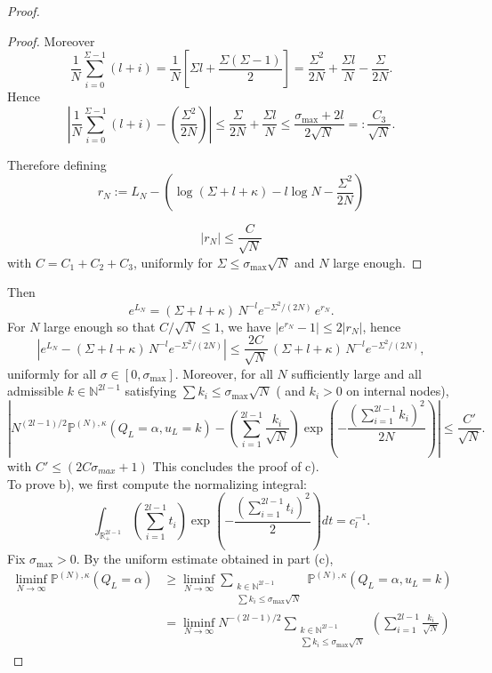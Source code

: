 \documentclass[10pt,a4paper]{amsart}
\begin{document}
\begin{proof}
\begin{proof}
\noindent
Moreover
\[
\frac1N\sum_{i=0}^{\Sigma-1}(l+i)
=
\frac1N\left[\Sigma l+\frac{\Sigma(\Sigma-1)}2\right]=
\frac{\Sigma^2}{2N}
+\frac{\Sigma l}{N}
-\frac{\Sigma}{2N}.
\]
\medskip
\noindent
Hence
\[
\left|
\frac1N\sum_{i=0}^{\Sigma-1}(l+i)
-
\left(\frac{\Sigma^2}{2N}\right)
\right|
\leq
\frac{\Sigma}{2N}+\frac{\Sigma l}{N}
\le
\frac{\sigma_{\max}+2l}{2\sqrt N}
=: \frac{C_3}{\sqrt N}.
\]

\medskip
\noindent
Therefore defining
\[
r_N:=L_N-
\left(\log(\Sigma+l+\kappa)-l\log N-\frac{\Sigma^2}{2N}\right)\]

\[ \left| r_N \right|
\le
\frac{C}{\sqrt N}
\]
with $C=C_1+C_2+C_3$,
uniformly for $\Sigma\le\sigma_{\max}\sqrt N$ and $N$ large enough.
\end{proof}

\medskip
\noindent
Then
\[
e^{L_N}=(\Sigma+l+\kappa)\,N^{-l}e^{-\Sigma^2/(2N)}\,e^{r_N}.
\]
For $N$ large enough so that $C/\sqrt N\le 1$, we have $|e^{r_N}-1|\le 2|r_N|$, hence
\[
\left|e^{L_N}-(\Sigma+l+\kappa)\,N^{-l}e^{-\Sigma^2/(2N)}\right|
\le \frac{2C}{\sqrt N}\,(\Sigma+l+\kappa)\,N^{-l}e^{-\Sigma^2/(2N)},
\]
uniformly for all $\sigma\in[0,\sigma_{\max}]$.
 Moreover, 
 for all $N$ sufficiently large and all admissible
$k\in\mathbb N^{2l-1}$ satisfying $\sum k_i\le \sigma_{\max}\sqrt N$ ( and $k_i >0$ on internal nodes),
\[
\left|
N^{(2l-1)/2}
\mathbb P^{(N),\kappa}(Q_L=\alpha,u_L=k)
-
\left(\sum_{i=1}^{2l-1}\frac{k_i}{\sqrt N}\right)
\exp\!\left(-\frac{(\sum_{i=1}^{2l-1}k_i)^2}{2N}\right)
\right|
\le \frac{C'}{\sqrt N}.
\]
with $C'\le (2C\sigma_{max}+1)$ This concludes the proof of c).\\
\medskip
\noindent
To prove b), we first compute the normalizing integral:
\[
\int_{\mathbb R_+^{2l-1}}
\left(\sum_{i=1}^{2l-1} t_i\right)
\exp\!\left(-\frac{(\sum_{i=1}^{2l-1} t_i)^2}{2}\right)
dt
=
c_l^{-1}.
\]
\medskip
\noindent
Fix $\sigma_{\max}>0$. By the uniform estimate obtained in part (c),
\begin{align*}
\liminf_{N\to\infty}
\mathbb P^{(N),\kappa}(Q_L=\alpha)
&\ge
\liminf_{N\to\infty}
\sum_{\substack{k\in\mathbb N^{2l-1}\\ \sum k_i\le \sigma_{\max}\sqrt N}}
\mathbb P^{(N),\kappa}(Q_L=\alpha,u_L=k)
\\
&=
\liminf_{N\to\infty}
N^{-(2l-1)/2}
\sum_{\substack{k\in\mathbb N^{2l-1}\\ \sum k_i\le \sigma_{\max}\sqrt N}}
\left(\sum_{i=1}^{2l-1}\frac{k_i}{\sqrt N}\right)

\end{align*}
\end{proof}
\end{document}
